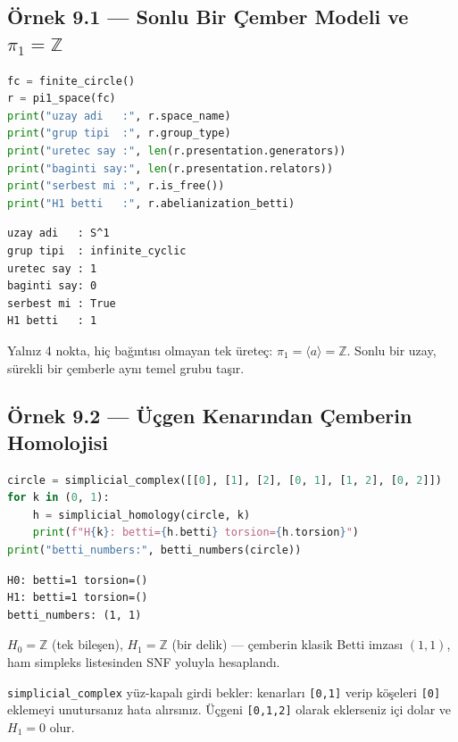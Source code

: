 \subsection*{Örnek 9.1 — Sonlu Bir Çember Modeli ve $\pi_1 = \mathbb{Z}$}

\begin{lstlisting}[language=Python]
fc = finite_circle()
r = pi1_space(fc)
print("uzay adi   :", r.space_name)
print("grup tipi  :", r.group_type)
print("uretec say :", len(r.presentation.generators))
print("baginti say:", len(r.presentation.relators))
print("serbest mi :", r.is_free())
print("H1 betti   :", r.abelianization_betti)
\end{lstlisting}

\begin{verbatim}
uzay adi   : S^1
grup tipi  : infinite_cyclic
uretec say : 1
baginti say: 0
serbest mi : True
H1 betti   : 1
\end{verbatim}

Yalnız 4 nokta, hiç bağıntısı olmayan tek üreteç: $\pi_1 = \langle a \rangle
= \mathbb{Z}$. Sonlu bir uzay, sürekli bir çemberle aynı temel grubu taşır.

\subsection*{Örnek 9.2 — Üçgen Kenarından Çemberin Homolojisi}

\begin{lstlisting}[language=Python]
circle = simplicial_complex([[0], [1], [2], [0, 1], [1, 2], [0, 2]])
for k in (0, 1):
    h = simplicial_homology(circle, k)
    print(f"H{k}: betti={h.betti} torsion={h.torsion}")
print("betti_numbers:", betti_numbers(circle))
\end{lstlisting}

\begin{verbatim}
H0: betti=1 torsion=()
H1: betti=1 torsion=()
betti_numbers: (1, 1)
\end{verbatim}

$H_0 = \mathbb{Z}$ (tek bileşen), $H_1 = \mathbb{Z}$ (bir delik) --- çemberin
klasik Betti imzası $(1, 1)$, ham simpleks listesinden SNF yoluyla hesaplandı.

\begin{dikkat}
\texttt{simplicial\_complex} yüz-kapalı girdi bekler: kenarları
\texttt{[0,1]} verip köşeleri \texttt{[0]} eklemeyi unutursanız hata alırsınız.
Üçgeni \texttt{[0,1,2]} olarak eklerseniz içi dolar ve $H_1 = 0$ olur.
\end{dikkat}

